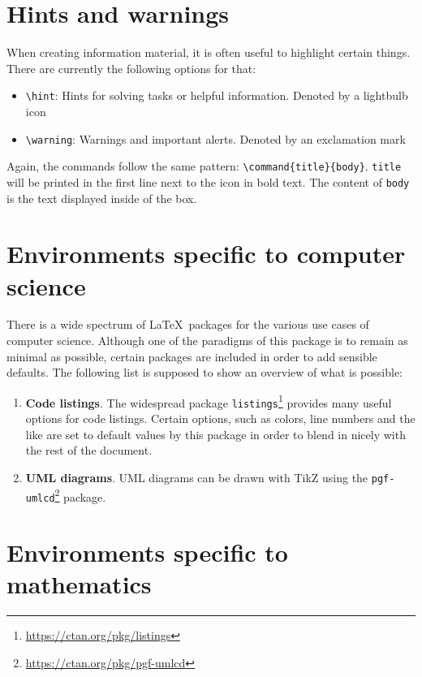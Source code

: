 \documentclass[11pt, a4paper, oneside]{article}
\begin{document}
	\section*{Hints and warnings}
	
	When creating information material, it is often useful to highlight certain things.
	There are currently the following options for that:
	\begin{itemize}[label=]
		\item \texttt{\textbackslash hint}: Hints for solving tasks or helpful information. Denoted by a lightbulb icon
		\item \texttt{\textbackslash warning}: Warnings and important alerts. Denoted by an exclamation mark
	\end{itemize}
	Again, the commands follow the same pattern: \texttt{\textbackslash command\{title\}\{body\}}.
	\texttt{title} will be printed in the first line next to the icon in bold text.
	The content of \texttt{body} is the text displayed inside of the box.
	
	\section*{Environments specific to computer science}
	
	There is a wide spectrum of \LaTeX\ packages for the various use cases of computer science.
	Although one of the paradigms of this package is to remain as minimal as possible, certain packages are included in order to add sensible defaults.
	The following list is supposed to show an overview of what is possible:
	\begin{enumerate}
		\item \textbf{Code listings}.
		The widespread package \texttt{listings}\footnote{\url{https://ctan.org/pkg/listings}} provides many useful options for code listings.
		Certain options, such as colors, line numbers and the like are set to default values by this package in order to blend in nicely with the rest of the document.
		\item \textbf{UML diagrams}.
		UML diagrams can be drawn with TikZ using the \texttt{pgf-umlcd}\footnote{\url{https://ctan.org/pkg/pgf-umlcd}} package.
	\end{enumerate}

	\section*{Environments specific to mathematics}
	
\end{document}
